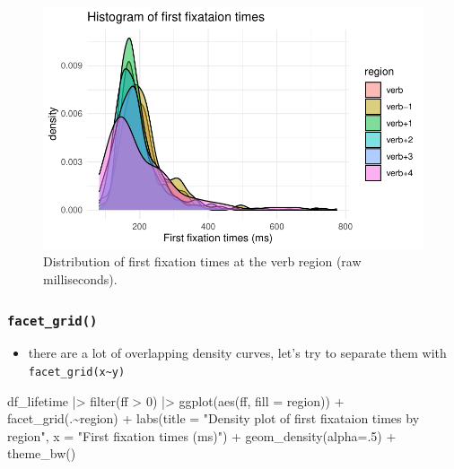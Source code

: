 \documentclass[
  letterpaper,
  DIV=11,
  numbers=noendperiod]{scrartcl}
\newenvironment{Shaded}{\begin{snugshade}}{\end{snugshade}}
\newcommand{\AttributeTok}[1]{\textcolor[rgb]{0.40,0.45,0.13}{#1}}
\newcommand{\DecValTok}[1]{\textcolor[rgb]{0.68,0.00,0.00}{#1}}
\newcommand{\FunctionTok}[1]{\textcolor[rgb]{0.28,0.35,0.67}{#1}}
\newcommand{\NormalTok}[1]{\textcolor[rgb]{0.00,0.23,0.31}{#1}}
\newcommand{\SpecialCharTok}[1]{\textcolor[rgb]{0.37,0.37,0.37}{#1}}
\newcommand{\StringTok}[1]{\textcolor[rgb]{0.13,0.47,0.30}{#1}}
\providecommand{\tightlist}{%
  \setlength{\itemsep}{0pt}\setlength{\parskip}{0pt}}\usepackage{longtable,booktabs,array}
\begin{document}
\begin{figure}[H]

{\centering \includegraphics{_data_viz_files/figure-pdf/unnamed-chunk-19-1.pdf}

}

\caption{Distribution of first fixation times at the verb region (raw
milliseconds).}

\end{figure}

\hypertarget{facet_grid}{%
\subsubsection{\texorpdfstring{\texttt{facet\_grid()}}{facet\_grid()}}\label{facet_grid}}

\begin{itemize}
\tightlist
\item
  there are a lot of overlapping density curves, let's try to separate
  them with \texttt{facet\_grid(x\textasciitilde{}y)}
\end{itemize}

\begin{Shaded}
\begin{Highlighting}[numbers=left,,]
\NormalTok{df\_lifetime }\SpecialCharTok{|\textgreater{}} 
  \FunctionTok{filter}\NormalTok{(ff }\SpecialCharTok{\textgreater{}} \DecValTok{0}\NormalTok{) }\SpecialCharTok{|\textgreater{}} 
  \FunctionTok{ggplot}\NormalTok{(}\FunctionTok{aes}\NormalTok{(ff, }\AttributeTok{fill =}\NormalTok{ region)) }\SpecialCharTok{+} 
  \FunctionTok{facet\_grid}\NormalTok{(.}\SpecialCharTok{\textasciitilde{}}\NormalTok{region) }\SpecialCharTok{+}
  \FunctionTok{labs}\NormalTok{(}\AttributeTok{title =} \StringTok{"Density plot of first fixataion times by region"}\NormalTok{,}
       \AttributeTok{x =} \StringTok{"First fixation times (ms)"}\NormalTok{) }\SpecialCharTok{+}
  \FunctionTok{geom\_density}\NormalTok{(}\AttributeTok{alpha=}\NormalTok{.}\DecValTok{5}\NormalTok{) }\SpecialCharTok{+}
  \FunctionTok{theme\_bw}\NormalTok{()}
\end{Highlighting}
\end{Shaded}
\end{document}
